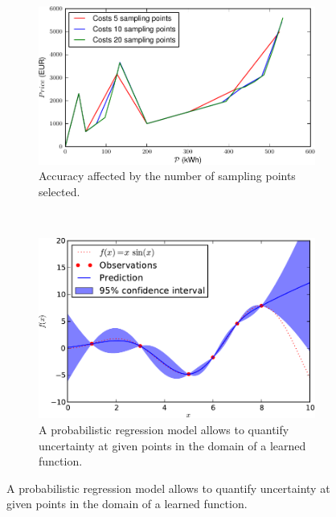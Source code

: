 \documentclass[conference]{IEEEtran}
\begin{document}
\begin{figure}
        \centering
        \begin{subfigure}[b]{0.5\textwidth}
        \centering
                \includegraphics[width=\textwidth]{img/costs}
                \caption{Accuracy affected by the number of sampling points selected.}
                \label{fig:sampling}
        \end{subfigure}%
        ~ \qquad%
        \begin{subfigure}[b]{0.45\textwidth}
        \centering
                \includegraphics[width=\textwidth]{img/gaussProc}
                \caption{A probabilistic regression model allows to quantify uncertainty at given points in the domain of a learned function.}
                \label{fig:mouse}
        \end{subfigure}
\end{figure}
\end{document}
